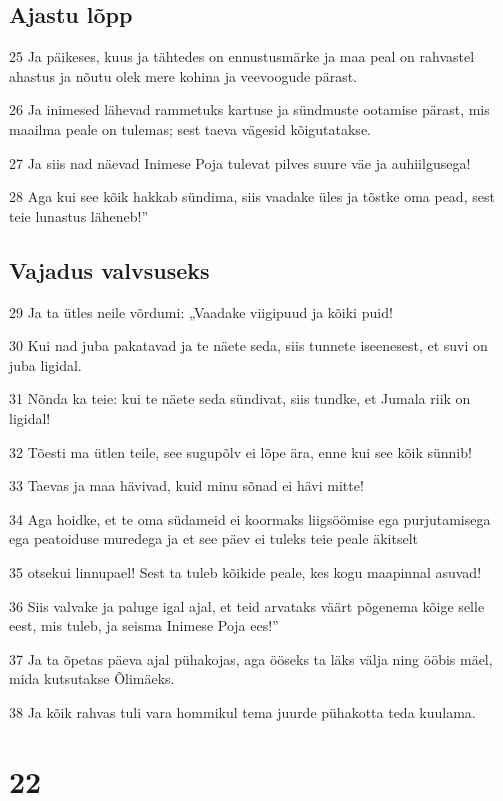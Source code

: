 \section*{Ajastu lõpp}

\par 25 Ja päikeses, kuus ja tähtedes on ennustusmärke ja maa peal on rahvastel ahastus ja nõutu olek mere kohina ja veevoogude pärast.
\par 26 Ja inimesed lähevad rammetuks kartuse ja sündmuste ootamise pärast, mis maailma peale on tulemas; sest taeva vägesid kõigutatakse.
\par 27 Ja siis nad näevad Inimese Poja tulevat pilves suure väe ja auhiilgusega!
\par 28 Aga kui see kõik hakkab sündima, siis vaadake üles ja tõstke oma pead, sest teie lunastus läheneb!”

\section*{Vajadus valvsuseks}

\par 29 Ja ta ütles neile võrdumi: „Vaadake viigipuud ja kõiki puid!
\par 30 Kui nad juba pakatavad ja te näete seda, siis tunnete iseenesest, et suvi on juba ligidal.
\par 31 Nõnda ka teie: kui te näete seda sündivat, siis tundke, et Jumala riik on ligidal!
\par 32 Tõesti ma ütlen teile, see sugupõlv ei lõpe ära, enne kui see kõik sünnib!
\par 33 Taevas ja maa hävivad, kuid minu sõnad ei hävi mitte!
\par 34 Aga hoidke, et te oma südameid ei koormaks liigsöömise ega purjutamisega ega peatoiduse muredega ja et see päev ei tuleks teie peale äkitselt
\par 35 otsekui linnupael! Sest ta tuleb kõikide peale, kes kogu maapinnal asuvad!
\par 36 Siis valvake ja paluge igal ajal, et teid arvataks väärt põgenema kõige selle eest, mis tuleb, ja seisma Inimese Poja ees!”
\par 37 Ja ta õpetas päeva ajal pühakojas, aga ööseks ta läks välja ning ööbis mäel, mida kutsutakse Õlimäeks.
\par 38 Ja kõik rahvas tuli vara hommikul tema juurde pühakotta teda kuulama.


\chapter{22}

